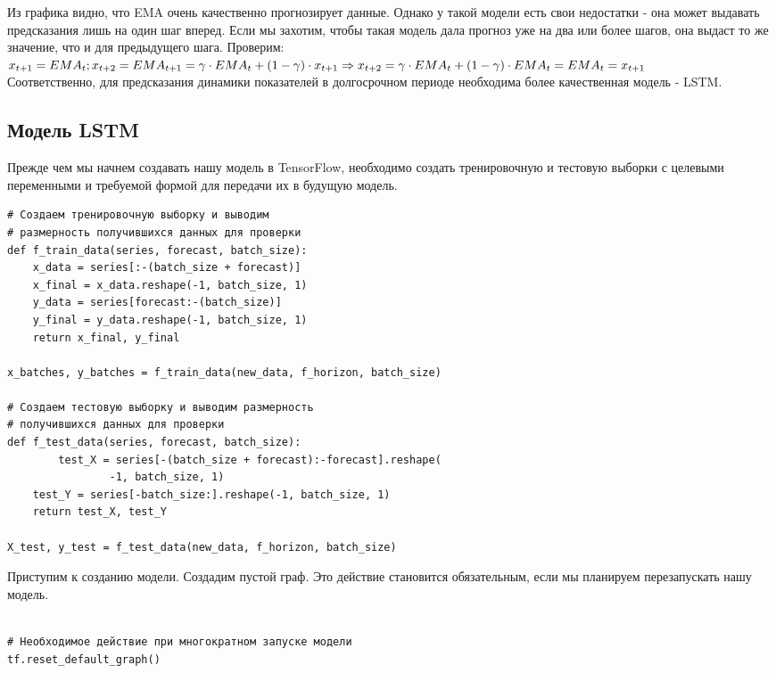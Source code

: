 \documentclass[12pt, a4paper]{article}
\begin{document}
Из графика видно, что EMA очень качественно прогнозирует данные. Однако у такой модели есть свои недостатки - она может выдавать предсказания лишь на один шаг вперед. Если мы захотим, чтобы такая модель дала прогноз уже на два или более шагов, она выдаст то же значение, что и для предыдущего шага. Проверим: \\
$x_{t+1} = EMA_t; \\
x_{t+2} = EMA_{t+1} = \gamma \cdot EMA_t + (1 - \gamma) \cdot x_{t+1} \Rightarrow x_{t+2} = \gamma \cdot EMA_t + (1 - \gamma) \cdot EMA_t = EMA_t = x_{t+1}$ \\

Соответственно, для предсказания динамики показателей в долгосрочном периоде необходима более качественная модель - LSTM.

\subsection{Модель LSTM}

Прежде чем мы начнем создавать нашу модель в TensorFlow, необходимо создать тренировочную и тестовую выборки с целевыми переменными и требуемой формой для передачи их в будущую модель.

\begin{verbatim}
# Создаем тренировочную выборку и выводим
# размерность получившихся данных для проверки
def f_train_data(series, forecast, batch_size):
    x_data = series[:-(batch_size + forecast)]
    x_final = x_data.reshape(-1, batch_size, 1)
    y_data = series[forecast:-(batch_size)]
    y_final = y_data.reshape(-1, batch_size, 1)
    return x_final, y_final

x_batches, y_batches = f_train_data(new_data, f_horizon, batch_size)

# Создаем тестовую выборку и выводим размерность
# получившихся данных для проверки
def f_test_data(series, forecast, batch_size):
		test_X = series[-(batch_size + forecast):-forecast].reshape(
				-1, batch_size, 1)
    test_Y = series[-batch_size:].reshape(-1, batch_size, 1)
    return test_X, test_Y

X_test, y_test = f_test_data(new_data, f_horizon, batch_size)
\end{verbatim}

Приступим к созданию модели. Создадим пустой граф. Это действие становится обязательным, если мы планируем перезапускать нашу модель.

\begin{verbatim}

# Необходимое действие при многократном запуске модели
tf.reset_default_graph()
\end{verbatim}
\end{document}
